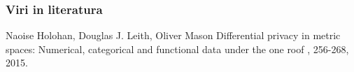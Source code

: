 \documentclass{beamer}
\begin{document}
\begin{frame}[allowframebreaks]
  \frametitle<presentation>{Viri in literatura}
    
  \begin{thebibliography}{10}
    

    
  \beamertemplatearticlebibitems

    Naoise Holohan, Douglas J. Leith, Oliver Mason
    \newblock Differential privacy in metric spaces: Numerical, categorical and functional data under the one roof
    , 256-268, 2015.
  \end{thebibliography}
\end{frame}
\end{document}

